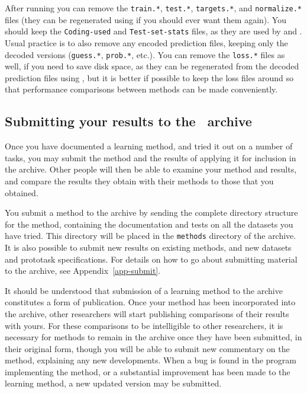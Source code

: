 After running \mloss{} you can remove the \texttt{train.*},
\texttt{test.*}, \texttt{targets.*}, and \texttt{normalize.*} files
(they can be regenerated using \mgendata{} if you should ever want
them again).  You should keep the \texttt{Coding-used} and
\texttt{Test-set-stats} files, as they are used by \mstats{} and
\minfo{}.  Usual practice is to also remove any encoded prediction
files, keeping only the decoded versions (\texttt{guess.*},
\texttt{prob.*}, etc.).  You can remove the \texttt{loss.*} files as
well, if you need to save disk space, as they can be regenerated from
the decoded prediction files using \mloss{}, but it is better if
possible to keep the loss files around so that performance comparisons
between methods can be made conveniently.


\subsection{Submitting your results to the \delve\ archive}
            \label{assess-prepare}

Once you have documented a learning method, and tried it out on a
number of tasks, you may submit the method and the results of applying
it for inclusion in the \delve{} archive.  Other people will then be
able to examine your method and results, and compare the results they
obtain with their methods to those that you obtained.

You submit a method to the archive by sending the complete directory
structure for the method, containing the documentation and tests on
all the datasets you have tried.  This directory will be placed in the
\texttt{methods} directory of the \delve{} archive.  It is also possible
to submit new results on existing methods, and new datasets and
prototask specifications.  For details on how to go about submitting
material to the \delve{} archive, see Appendix~\ref{app-submit}.

It should be understood that submission of a learning method to the
\delve{} archive constitutes a form of publication.  Once your method
has been incorporated into the archive, other researchers will start
publishing comparisons of their results with yours.  For these
comparisons to be intelligible to other researchers, it is necessary
for methods to remain in the archive once they have been submitted, in
their original form, though you will be able to submit new commentary
on the method, explaining any new developments.  When a bug is found
in the program implementing the method, or a substantial improvement
has been made to the learning method, a new updated version may be
submitted.
